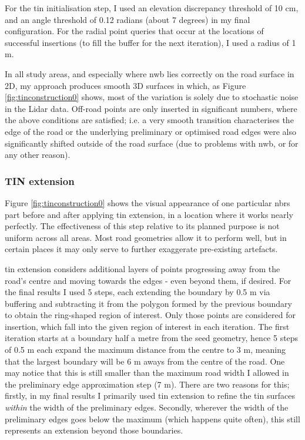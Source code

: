 For the \ac{tin} initialisation step, I used an elevation discrepancy threshold of 10 cm, and an angle threshold of 0.12 radians (about 7 degrees) in my final configuration. For the radial point queries that occur at the locations of successful insertions (to fill the buffer for the next iteration), I used a radius of 1 m.

In all study areas, and especially where \ac{nwb} lies correctly on the road surface in 2D, my approach produces smooth 3D surfaces in which, as Figure \ref{fig:tinconstruction0} shows, most of the variation is solely due to stochastic noise in the Lidar data. Off-road points are only inserted in significant numbers, where the above conditions are satisfied; i.e. a very smooth transition characterises the edge of the road or the underlying preliminary or optimised road edges were also significantly shifted outside of the road surface (due to problems with \ac{nwb}, or for any other reason).

\subsubsection{TIN extension}

Figure \ref{fig:tinconstruction0} shows the visual appearance of one particular \ac{nbrs} part before and after applying \ac{tin} extension, in a location where it works nearly perfectly. The effectiveness of this step relative to its planned purpose is not uniform across all areas. Most road geometries allow it to perform well, but in certain places it may only serve to further exaggerate pre-existing artefacts.

\ac{tin} extension considers additional layers of points progressing away from the road's centre and moving towards the edges - even beyond them, if desired. For the final results I used 5 steps, each extending the boundary by 0.5 m via buffering and subtracting it from the polygon formed by the previous boundary to obtain the ring-shaped region of interest. Only those points are considered for insertion, which fall into the given region of interest in each iteration. The first iteration starts at a boundary half a metre from the seed geometry, hence 5 steps of 0.5 m each expand the maximum distance from the centre to 3 m, meaning that the largest boundary will be 6 m aways from the centre of the road. One may notice that this is still smaller than the maximum road width I allowed in the preliminary edge approximation step (7 m). There are two reasons for this; firstly, in my final results I primarily used \ac{tin} extension to refine the \ac{tin} surfaces \textit{within} the width of the preliminary edges. Secondly, wherever the width of the preliminary edges goes below the maximum (which happens quite often), this still represents an extension beyond those boundaries.

